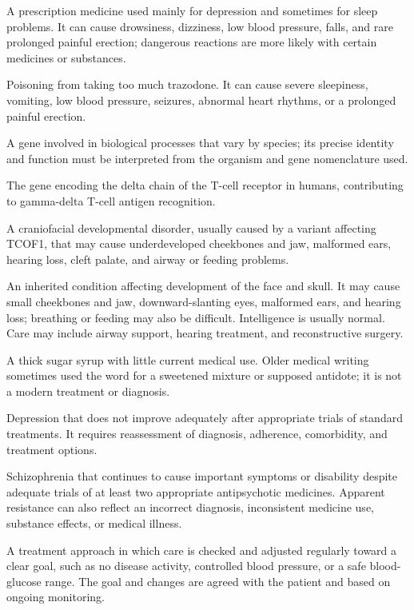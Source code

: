  A prescription medicine used mainly for depression and sometimes for sleep problems. It can cause drowsiness, dizziness, low blood pressure, falls, and rare prolonged painful erection; dangerous reactions are more likely with certain medicines or substances.

 Poisoning from taking too much trazodone. It can cause severe sleepiness, vomiting, low blood pressure, seizures, abnormal heart rhythms, or a prolonged painful erection.

 A gene involved in biological processes that vary by species; its precise identity and function must be interpreted from the organism and gene nomenclature used.

 The gene encoding the delta chain of the T-cell receptor in humans, contributing to gamma-delta T-cell antigen recognition.

 A craniofacial developmental disorder, usually caused by a variant affecting TCOF1, that may cause underdeveloped cheekbones and jaw, malformed ears, hearing loss, cleft palate, and airway or feeding problems.

 An inherited condition affecting development of the face and skull. It may cause small cheekbones and jaw, downward-slanting eyes, malformed ears, and hearing loss; breathing or feeding may also be difficult. Intelligence is usually normal. Care may include airway support, hearing treatment, and reconstructive surgery.

 A thick sugar syrup with little current medical use. Older medical writing sometimes used the word for a sweetened mixture or supposed antidote; it is not a modern treatment or diagnosis.

 Depression that does not improve adequately after appropriate trials of standard
treatments. It requires reassessment of diagnosis, adherence, comorbidity, and treatment
options.

 Schizophrenia that continues to cause important symptoms or disability despite adequate trials of at least two appropriate antipsychotic medicines. Apparent resistance can also reflect an incorrect diagnosis, inconsistent medicine use, substance effects, or medical illness.

 A treatment approach in which care is checked and adjusted regularly toward a clear goal, such as no disease activity, controlled blood pressure, or a safe blood-glucose range. The goal and changes are agreed with the patient and based on ongoing monitoring.

